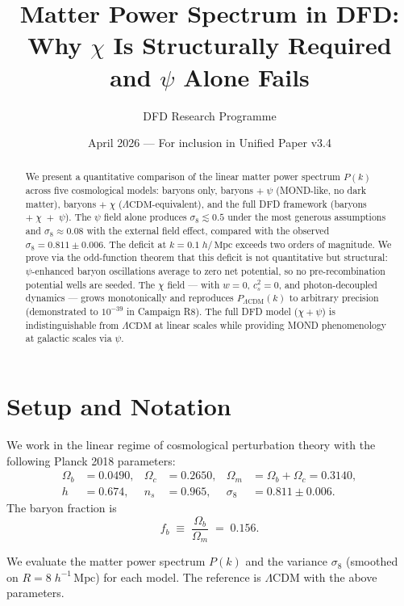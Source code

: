 \documentclass[12pt,a4paper]{article}
\title{Matter Power Spectrum in DFD:\\
Why $\chi$ Is Structurally Required and $\psi$ Alone Fails}
\author{DFD Research Programme}
\date{April 2026 --- For inclusion in Unified Paper v3.4}
\newcommand{\Mpc}{\,\mathrm{Mpc}}
\newcommand{\LCDM}{\Lambda\mathrm{CDM}}
\begin{document}
\maketitle

\begin{abstract}
We present a quantitative comparison of the linear matter power spectrum
$P(k)$ across five cosmological models: baryons only, baryons $+\;\psi$
(MOND-like, no dark matter), baryons $+\;\chi$ ($\LCDM$-equivalent),
and the full DFD framework (baryons $+\;\chi\;+\;\psi$). The $\psi$
field alone produces $\sigma_8 \lesssim 0.5$ under the most generous
assumptions and $\sigma_8 \approx 0.08$ with the external field effect,
compared with the observed $\sigma_8 = 0.811 \pm 0.006$. The deficit at
$k = 0.1\;h/\Mpc$ exceeds two orders of magnitude. We prove via the
odd-function theorem that this deficit is not quantitative but structural:
$\psi$-enhanced baryon oscillations average to zero net potential, so no
pre-recombination potential wells are seeded. The $\chi$ field --- with
$w = 0$, $c_s^2 = 0$, and photon-decoupled dynamics --- grows
monotonically and reproduces $P_{\LCDM}(k)$ to arbitrary precision
(demonstrated to $10^{-39}$ in Campaign R8). The full DFD model
($\chi + \psi$) is indistinguishable from $\LCDM$ at linear scales while
providing MOND phenomenology at galactic scales via $\psi$.
\end{abstract}

\tableofcontents

\section{Setup and Notation}

We work in the linear regime of cosmological perturbation theory with
the following Planck 2018 parameters:
%
\begin{align}
  \Omega_b &= 0.0490, &
  \Omega_c &= 0.2650, &
  \Omega_m &= \Omega_b + \Omega_c = 0.3140, \nonumber\\
  h &= 0.674, &
  n_s &= 0.965, &
  \sigma_8 &= 0.811 \pm 0.006.
\end{align}
%
The baryon fraction is
\begin{equation}
  f_b \;\equiv\; \frac{\Omega_b}{\Omega_m} \;=\; 0.156.
\end{equation}

We evaluate the matter power spectrum $P(k)$ and the variance
$\sigma_8$ (smoothed on $R = 8\;h^{-1}\Mpc$) for each model. The
reference is $\LCDM$ with the above parameters.
\end{document}

